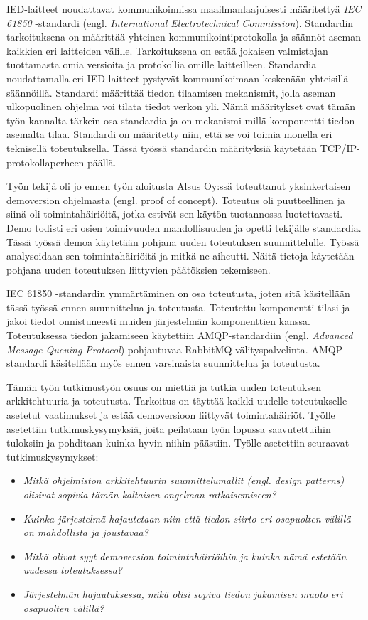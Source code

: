 IED-laitteet noudattavat kommunikoinnissa maailmanlaajuisesti määritettyä \emph{IEC 61850} -standardi (engl. \emph{International Electrotechnical Commission}). Standardin tarkoituksena on määrittää yhteinen kommunikointiprotokolla ja säännöt aseman kaikkien eri laitteiden välille. Tarkoituksena on estää jokaisen valmistajan tuottamasta omia versioita ja protokollia omille laitteilleen. Standardia noudattamalla eri IED-laitteet pystyvät kommunikoimaan keskenään yhteisillä säännöillä. Standardi määrittää tiedon tilaamisen mekanismit, jolla aseman ulkopuolinen ohjelma voi tilata tiedot verkon yli. Nämä määritykset ovat tämän työn kannalta tärkein osa standardia ja on mekanismi millä komponentti tiedon asemalta tilaa. Standardi on määritetty niin, että se voi toimia monella eri teknisellä toteutuksella. Tässä työssä standardin määrityksiä käytetään TCP/IP-protokollaperheen päällä.

Työn tekijä oli jo ennen työn aloitusta Alsus Oy:ssä toteuttanut yksinkertaisen demoversion ohjelmasta (engl. proof of concept). Toteutus oli puutteellinen ja siinä oli toimintahäiriöitä, jotka estivät sen käytön tuotannossa luotettavasti. Demo todisti eri osien toimivuuden mahdollisuuden ja opetti tekijälle standardia. Tässä työssä demoa käytetään pohjana uuden toteutuksen suunnittelulle. Työssä analysoidaan sen toimintahäiriöitä ja mitkä ne aiheutti. Näitä tietoja käytetään pohjana uuden toteutuksen liittyvien päätöksien tekemiseen.

IEC 61850 -standardin ymmärtäminen on osa toteutusta, joten sitä käsitellään tässä työssä ennen suunnittelua ja toteutusta. Toteutettu komponentti tilasi ja jakoi tiedot onnistuneesti muiden järjestelmän komponenttien kanssa. Toteutuksessa tiedon jakamiseen käytettiin AMQP-standardiin (engl. \emph{Advanced Message Queuing Protocol}) pohjautuvaa RabbitMQ-välityspalvelinta. AMQP-standardi käsitellään myös ennen varsinaista suunnittelua ja toteutusta.

Tämän työn tutkimustyön osuus on miettiä ja tutkia uuden toteutuksen arkkitehtuuria ja toteutusta. Tarkoitus on täyttää kaikki uudelle toteutukselle asetetut vaatimukset ja estää demoversioon liittyvät toimintahäiriöt. Työlle asetettiin tutkimuskysymyksiä, joita peilataan työn lopussa saavutettuihin tuloksiin ja pohditaan kuinka hyvin niihin päästiin. Työlle asetettiin seuraavat tutkimuskysymykset:
\begin{itemize}
	\item \emph{Mitkä ohjelmiston arkkitehtuurin suunnittelumallit (engl. design patterns) olisivat sopivia tämän kaltaisen ongelman ratkaisemiseen?}
	\item \emph{Kuinka järjestelmä hajautetaan niin että tiedon siirto eri osapuolten välillä on mahdollista ja joustavaa?}
	\item \emph{Mitkä olivat syyt demoversion toimintahäiriöihin ja kuinka nämä estetään uudessa toteutuksessa?}
	\item \emph{Järjestelmän hajautuksessa, mikä olisi sopiva tiedon jakamisen muoto eri osapuolten välillä?}
\end{itemize}